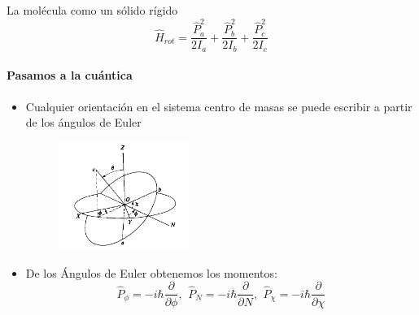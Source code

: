 \documentclass[a4paper]{beamer}
\begin{document}
\begin{frame}{La molécula como un sólido rígido}
\begin{equation*}
\hat H_{rot}=\frac{\hat P_a^2}{2I_a}+\frac{\hat P_b^2}{2I_b}+\frac{\hat P_c^2}{2I_c}
\end{equation*}
\framesubtitle{Pasamos a la cuántica}
\begin{itemize}
\item Cualquier orientación en el sistema centro de masas se puede escribir a partir de los ángulos de Euler
\begin{figure}
\includegraphics[width=0.4\textwidth]{Angulos_Euler.png}
\label{euler}
\end{figure}
\item De los Ángulos de Euler obtenemos los momentos:
$$
\hat P_{\phi}=-i\hbar\frac{\partial}{\partial \phi},\,\ \hat P_{N}=-i\hbar\frac{\partial}{\partial N},\,\ \hat P_{\chi}=-i\hbar\frac{\partial}{\partial \chi}
$$
\end{itemize}
\end{frame}
\end{document}
